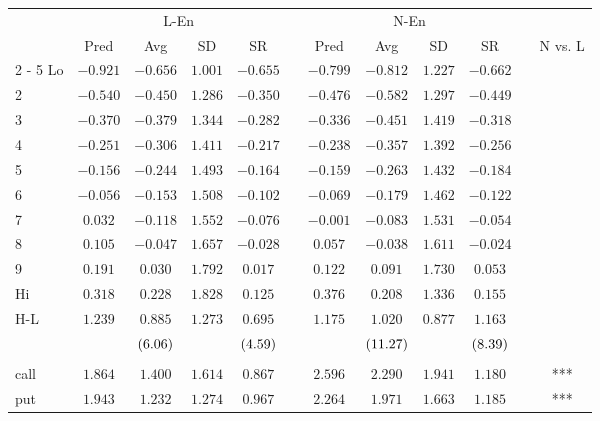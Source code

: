 \begin{tabular}{@{}lccccccccccc@{}}%
\toprule%
&\multicolumn{4}{c}{L{-}En}&&\multicolumn{4}{c}{N{-}En}&&\\%
\multicolumn{1}{c}{}&\multicolumn{1}{c}{Pred}&\multicolumn{1}{c}{Avg}&\multicolumn{1}{c}{SD}&\multicolumn{1}{c}{SR}&\multicolumn{1}{c}{}&\multicolumn{1}{c}{Pred}&\multicolumn{1}{c}{Avg}&\multicolumn{1}{c}{SD}&\multicolumn{1}{c}{SR}&\multicolumn{1}{c}{}&\multicolumn{1}{c}{N vs. L}\\%
\cmidrule{2%
-%
5}%
\cmidrule{7%
-%
10}%
\cmidrule{12%
-%
12}%
Lo&$-0.921$&$-0.656$&$1.001$&$-0.655$&&$-0.799$&$-0.812$&$1.227$&$-0.662$&&\\%
2&$-0.540$&$-0.450$&$1.286$&$-0.350$&&$-0.476$&$-0.582$&$1.297$&$-0.449$&&\\%
3&$-0.370$&$-0.379$&$1.344$&$-0.282$&&$-0.336$&$-0.451$&$1.419$&$-0.318$&&\\%
4&$-0.251$&$-0.306$&$1.411$&$-0.217$&&$-0.238$&$-0.357$&$1.392$&$-0.256$&&\\%
5&$-0.156$&$-0.244$&$1.493$&$-0.164$&&$-0.159$&$-0.263$&$1.432$&$-0.184$&&\\%
6&$-0.056$&$-0.153$&$1.508$&$-0.102$&&$-0.069$&$-0.179$&$1.462$&$-0.122$&&\\%
7&$0.032$&$-0.118$&$1.552$&$-0.076$&&$-0.001$&$-0.083$&$1.531$&$-0.054$&&\\%
8&$0.105$&$-0.047$&$1.657$&$-0.028$&&$0.057$&$-0.038$&$1.611$&$-0.024$&&\\%
9&$0.191$&$0.030$&$1.792$&$0.017$&&$0.122$&$0.091$&$1.730$&$0.053$&&\\%
Hi&$0.318$&$0.228$&$1.828$&$0.125$&&$0.376$&$0.208$&$1.336$&$0.155$&&\\%
\midrule%
H{-}L&$1.239$&$0.885$&$1.273$&$0.695$&&$1.175$&$1.020$&$0.877$&$1.163$&&\\%
&&$\footnotesize{(6.06)}$&&$\footnotesize{(4.59)}$&&&$\footnotesize{(11.27)}$&&$\footnotesize{(8.39)}$&&\\%
&&&&&&&&&&&\\%
call&$1.864$&$1.400$&$1.614$&$0.867$&&$2.596$&$2.290$&$1.941$&$1.180$&&***\\%
put&$1.943$&$1.232$&$1.274$&$0.967$&&$2.264$&$1.971$&$1.663$&$1.185$&&***\\\bottomrule%
%
\end{tabular}